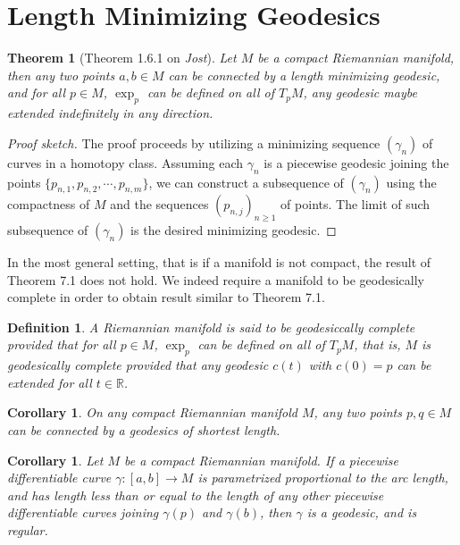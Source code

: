 \documentclass[11pt]{book}
\theoremstyle{break}
\theoremstyle{break}
\newtheorem{thm}{Theorem}[section]
\newtheorem{corT}[lem]{Corollary}
\newtheorem{defn}{Definition}[corL]
\newcommand{\R}{\mathbb{R}}
\begin{document}
\newpage
\section[Length Minimizing Geodesics]{\color{red} Length Minimizing Geodesics \color{black}}
\begin{thm}[Theorem 1.6.1 on \textit{Jost}]
Let $M $ be a compact Riemannian manifold, then any two points $a,b \in M$ can be connected by a length minimizing geodesic, and for all $p\in M$, $\exp_p$ can be defined on all of $T_pM$, any geodesic maybe extended indefinitely in any direction.
\end{thm}
\begin{proof}[Proof sketch]
The proof proceeds by utilizing a minimizing sequence $(\gamma_n)$ of curves in a homotopy class. Assuming each $\gamma_n$ is a piecewise geodesic joining the points $\{p_{n,1}, p_{n,2},\cdots, p_{n,m}\}$, we can construct a subsequence of $(\gamma_n)$ using the compactness of $M$ and the sequences $(p_{n,j})_{n\geq 1}$ of points. The limit of such subsequence of $(\gamma_n)$ is the desired minimizing geodesic. 
\end{proof}

In the most general setting, that is if a manifold is not compact, the result of Theorem 7.1 does not hold. We indeed require a manifold to be geodesically complete in order to obtain result similar to Theorem 7.1.

\begin{defn}
A Riemannian manifold is said to be geodesiccally complete provided that for all $p \in M$, $\exp_p$ can be defined on all of $T_pM$, that is, $M$ is geodesically complete provided that any geodesic $c(t)$ with $c(0) = p$ can be extended for all $t \in \R$.  
\end{defn}

\begin{corT}
On any compact Riemannian manifold $M$, any two points $p,q \in M$ can be connected by a geodesics of shortest length.
\end{corT}

\begin{corT}
Let $M$ be a compact Riemannian manifold. If a piecewise differentiable curve $\gamma:[a,b] \to M$ is parametrized proportional to the arc length, and has length less than or equal to the length of any other piecewise differentiable curves joining $\gamma(p)$ and $\gamma(b)$, then $\gamma$ is a geodesic, and is regular. 
\end{corT}
\end{document}

